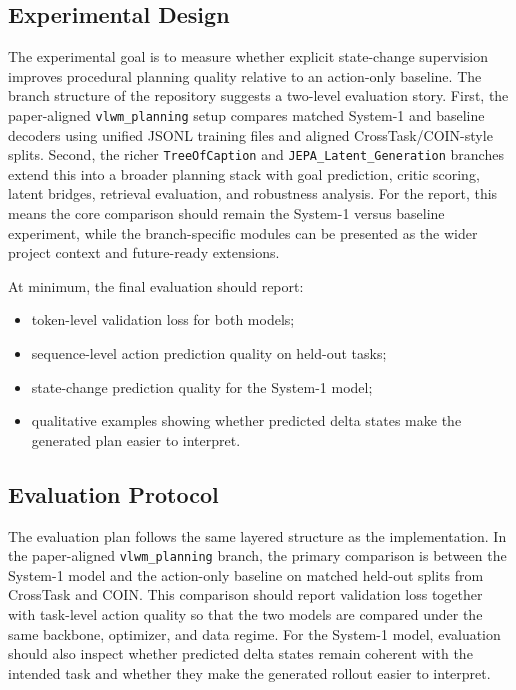 \documentclass[11pt]{article}
\begin{document}
\subsection{Experimental Design}
The experimental goal is to measure whether explicit state-change supervision improves procedural planning quality relative to an action-only baseline. The branch structure of the repository suggests a two-level evaluation story. First, the paper-aligned \texttt{vlwm\_planning} setup compares matched System-1 and baseline decoders using unified JSONL training files and aligned CrossTask/COIN-style splits. Second, the richer \texttt{TreeOfCaption} and \texttt{JEPA\_Latent\_Generation} branches extend this into a broader planning stack with goal prediction, critic scoring, latent bridges, retrieval evaluation, and robustness analysis. For the report, this means the core comparison should remain the System-1 versus baseline experiment, while the branch-specific modules can be presented as the wider project context and future-ready extensions.

At minimum, the final evaluation should report:
\begin{itemize}
  \item token-level validation loss for both models;
  \item sequence-level action prediction quality on held-out tasks;
  \item state-change prediction quality for the System-1 model;
  \item qualitative examples showing whether predicted delta states make the generated plan easier to interpret.
\end{itemize}

\subsection{Evaluation Protocol}
The evaluation plan follows the same layered structure as the implementation. In the paper-aligned \texttt{vlwm\_planning} branch, the primary comparison is between the System-1 model and the action-only baseline on matched held-out splits from CrossTask and COIN. This comparison should report validation loss together with task-level action quality so that the two models are compared under the same backbone, optimizer, and data regime. For the System-1 model, evaluation should also inspect whether predicted delta states remain coherent with the intended task and whether they make the generated rollout easier to interpret.
\end{document}
